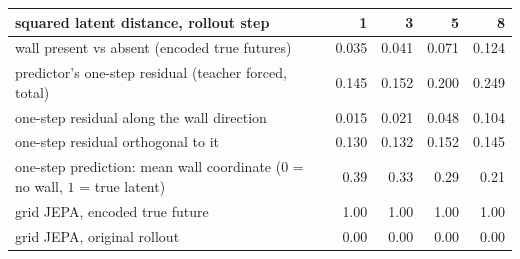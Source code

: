 \begin{tabular}{lrrrr}
\toprule
squared latent distance, rollout step & 1 & 3 & 5 & 8 \\
\midrule
wall present vs absent (encoded true futures) & 0.035 & 0.041 & 0.071 & 0.124 \\
predictor's one-step residual (teacher forced, total) & 0.145 & 0.152 & 0.200 & 0.249 \\
one-step residual along the wall direction & 0.015 & 0.021 & 0.048 & 0.104 \\
one-step residual orthogonal to it & 0.130 & 0.132 & 0.152 & 0.145 \\
one-step prediction: mean wall coordinate ($0$ = no wall, $1$ = true latent) & 0.39 & 0.33 & 0.29 & 0.21 \\
\midrule
grid JEPA, encoded true future & 1.00 & 1.00 & 1.00 & 1.00 \\
grid JEPA, original rollout & 0.00 & 0.00 & 0.00 & 0.00 \\
\bottomrule
\end{tabular}
